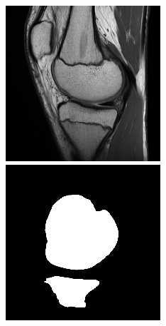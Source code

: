 \begin{figure}[H]
\endminipage\hfill
{}%
  \includegraphics[width=\linewidth]{imgs/transfer_pers_x4.png}
\endminipage
\vspace{0.15cm}
  \includegraphics[width=\linewidth]{imgs/transfer_pers_y1.png}

\end{figure}

